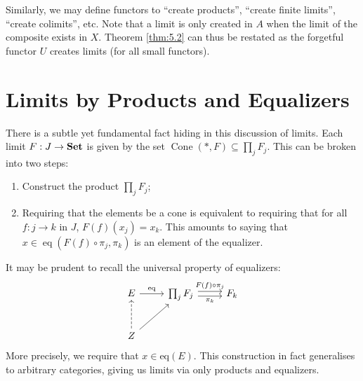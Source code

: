 Similarly, we may define functors to ``create products'', ``create finite limits'', ``create colimits'', etc. Note that a limit is only created in $A$ when the limit of the composite exists in $X$. Theorem \ref{thm:5.2} can thus be restated as the forgetful functor $U$ creates limits (for all small functors).

\section{Limits by Products and Equalizers}

There is a subtle yet fundamental fact hiding in this discussion of limits. Each limit $F : J \to \mathbf{Set} $ is given by the set $\operatorname{Cone} (*,F)\subseteq \prod_{j} F_j$. This can be broken into two steps:
\begin{enumerate}
	\item Construct the product $\prod_{j} F_j$;
	\item Requiring that the elements be a cone is equivalent to requiring that for all $f : j \to k$ in $J$, $F(f)(x_j)=x_k$. This amounts to saying that $x\in \operatorname{eq} (F(f)\circ \pi _j,\pi _k)$ is an element of the equalizer.
\end{enumerate}

It may be prudent to recall the universal property of equalizers:
\[\begin{tikzcd}[row sep = 2.5em, column sep = 2.5em]
E \ar[" \mathrm{eq}  ", r]  & \prod_{j} F_j \ar[" F(f)\circ \pi _j ", shift left, r] \ar[" \pi _k "', shift right, r]  & F_k \\
Z\ar[dashed, u] \ar[ur]  &  & 
\end{tikzcd}\]
More precisely, we require that $x\in \mathrm{eq} (E)$. This construction in fact generalises to arbitrary categories, giving us limits via only products and equalizers.

